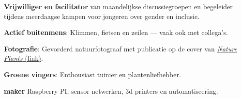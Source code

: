 \documentclass[a4paper,10pt]{article}
\begin{document}
\begin{description}
  \raggedright
  \item \textbf{Vrijwilliger en facilitator} van maandelijkse discussiegroepen en begeleider tijdens meerdaagse kampen voor jongeren over gender en inclusie.
  \item \textbf{Actief buitenmens}: Klimmen, fietsen en zeilen — vaak ook met collega’s.
  \item \textbf{Fotografie}: Gevorderd natuurfotograaf met publicatie op de cover van \href{https://lauralwd.github.io/photography/}{\emph{Nature Plants} (link)}.
  \item \textbf{Groene vingers}: Enthousiast tuinier en plantenliefhebber.
  \item \textbf{maker} Raspberry PI, sensor netwerken, 3d printers en automatiseering.
\end{description}

\vfill
\end{document}
